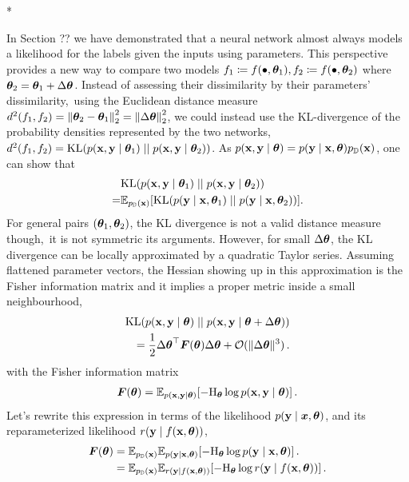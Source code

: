 \switchcolumn[1]*
\switchcolumn[0]

In Section ??
we have demonstrated that a neural network almost always models a likelihood for the labels given the inputs using parameters.
This perspective provides a new way to compare two models $f_1 \coloneq f(\bullet, {\bm{\theta}}_1), f_2 \coloneq f(\bullet, {\bm{\theta}}_{2})$ where ${\bm{\theta}}_2 = {\bm{\theta}}_1 + \Delta {\bm{\theta}}$.
Instead of assessing their dissimilarity by their parameters' dissimilarity, \eg\,using the Euclidean distance measure $d^2(f_1, f_2) = \left\lVert {\bm{\theta}}_2 - {\bm{\theta}}_1 \right\rVert_2^2 = \left\lVert \Delta {\bm{\theta}} \right\rVert_2^2$, we could instead use the KL-divergence of the probability densities represented by the two networks, $d^2(f_1, f_2) = \mathrm{KL}(p({\mathbf{x}}, {\mathbf{y}} \mid {\bm{\theta}}_1) \mid\mid p({\mathbf{x}}, {\mathbf{y}} \mid {\bm{\theta}}_2))$.
As $p({\mathbf{x}}, {\mathbf{y}} \mid {\bm{\theta}}) = p({\mathbf{y}} \mid {\mathbf{x}}, {\bm{\theta}})p_{{\mathbb{D}}}({\mathbf{x}})$, one can show that
\begin{align*}
    & \mathrm{KL}(p({\mathbf{x}}, {\mathbf{y}} \mid {\bm{\theta}}_1) \mid\mid p({\mathbf{x}}, {\mathbf{y}} \mid {\bm{\theta}}_2))                               \\
  = & \mathbb{E}_{p_{{\mathbb{D}}}({\mathbf{x}})} [\mathrm{KL}(p({\mathbf{y}} \mid {\mathbf{x}}, {\bm{\theta}}_1) \mid\mid p({\mathbf{y}} \mid {\mathbf{x}}, {\bm{\theta}}_2))].
\end{align*}
For general pairs $({\bm{\theta}}_1, {\bm{\theta}}_2)$, the KL divergence is not a valid distance measure though, \eg\,it is not symmetric \wrt its arguments.
However, for small $\Delta {\bm{\theta}}$, the KL divergence can be locally approximated by a quadratic Taylor series.
Assuming flattened parameter vectors, the Hessian showing up in this approximation is the Fisher information matrix and it implies a proper metric inside a small neighbourhood,
\begin{align*}
  \mathrm{KL}(p({\mathbf{x}}, {\mathbf{y}} \mid {\bm{\theta}}) \mid\mid p({\mathbf{x}}, {\mathbf{y}} \mid {\bm{\theta}} + \Delta {\bm{\theta}}))
  \\
  = \frac{1}{2} {\Delta {\bm{\theta}}}^{\top} {\bm{F}}({\bm{\theta}}) \Delta {\bm{\theta}} + {\mathcal{O}}( \Vert\Delta {\bm{\theta}}\Vert^3)\,.
\end{align*}
with the Fisher information matrix
\begin{align*}
  {\bm{F}}({\bm{\theta}}) = \mathbb{E}_{p({\mathbf{x}}, {\mathbf{y}} \mid {\bm{\theta}})} [-\mathrm{H}_{{\bm{\theta}}} \log p({\mathbf{x}}, {\mathbf{y}} \mid {\bm{\theta}})]\,.
\end{align*}
Let's rewrite this expression in terms of the likelihood $p({\mathbf{y}} \mid {\bm{x}}, {\bm{\theta}})$, and its reparameterized likelihood $r({\mathbf{y}} \mid f({\mathbf{x}}, {\bm{\theta}}))$,
\begin{align*}
  {\bm{F}}({\bm{\theta}})
   & =
  \mathbb{E}_{p_{{\mathbb{D}}}({\mathbf{x}})}\mathbb{E}_{p({\mathbf{y}} \mid {\mathbf{x}}, {\bm{\theta}})} [-\mathrm{H}_{{\bm{\theta}}} \log p({\mathbf{y}} \mid {\mathbf{x}}, {\bm{\theta}})]\,.
  \\
   & =
  \mathbb{E}_{p_{{\mathbb{D}}}({\mathbf{x}})}\mathbb{E}_{r({\mathbf{y}} \mid f({\mathbf{x}}, {\bm{\theta}}))} [-\mathrm{H}_{{\bm{\theta}}} \log r({\mathbf{y}} \mid f({\mathbf{x}}, {\bm{\theta}}))]\,.
\end{align*}
